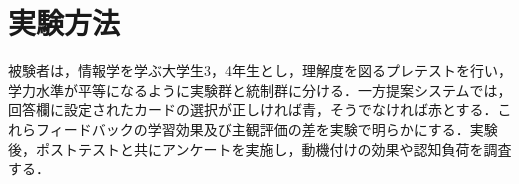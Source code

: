 

\section{実験方法}

被験者は，情報学を学ぶ大学生3，4年生とし，理解度を図るプレテストを行い，学力水準が平等になるように実験群と統制群に分ける．一方提案システムでは，回答欄に設定されたカードの選択が正しければ青，そうでなければ赤とする．これらフィードバックの学習効果及び主観評価の差を実験で明らかにする．実験後，ポストテストと共にアンケートを実施し，動機付けの効果や認知負荷を調査する．

\fi